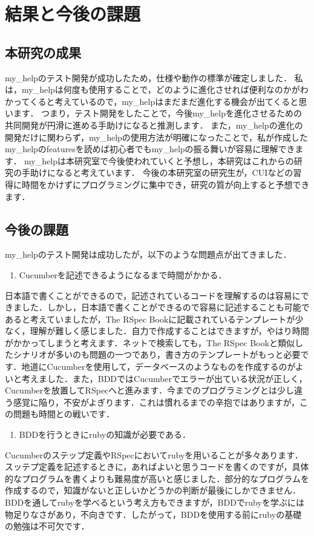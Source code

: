 \section{結果と今後の課題}
\subsection{本研究の成果}
my\_helpのテスト開発が成功したため，仕様や動作の標準が確定しました．
私は，my\_helpは何度も使用することで，どのように進化させれば便利なのかがわかってくると考えているので，my\_helpはまだまだ進化する機会が出てくると思います．
つまり，テスト開発をしたことで，今後my\_helpを進化させるための共同開発が円滑に進める手助けになると推測します．
また，my\_helpの進化の開発だけに関わらず，my\_helpの使用方法が明確になったことで，私が作成したmy\_helpのfeaturesを読めば初心者でもmy\_helpの振る舞いが容易に理解できます．
my\_helpは本研究室で今後使われていくと予想し，本研究はこれからの研究の手助けになると考えています．
今後の本研究室の研究生が，CUIなどの習得に時間をかけずにプログラミングに集中でき，研究の質が向上すると予想できます．

\subsection{今後の課題}
my\_helpのテスト開発は成功したが，以下のような問題点が出てきました．

\begin{enumerate}
\item Cucumberを記述できるようになるまで時間がかかる．
\end{enumerate}
日本語で書くことができるので，記述されているコードを理解するのは容易にできました．しかし，日本語で書くことができるので容易に記述することも可能であると考えていましたが，The RSpec Bookに記載されているテンプレートが少なく，理解が難しく感じました．自力で作成することはできますが，やはり時間がかかってしまうと考えます．ネットで検索しても，The RSpec Bookと類似したシナリオが多いのも問題の一つであり，書き方のテンプレートがもっと必要です．地道にCucumberを使用して，データベースのようなものを作成するのがよいと考えました．また，BDDではCucumberでエラーが出ている状況が正しく，Cucumberを放置してRSpecへと進みます．今までのプログラミングとは少し違う感覚に陥り，不安がよぎります．これは慣れるまでの辛抱ではありますが，この問題も時間との戦いです．

\begin{enumerate}
\item BDDを行うときにrubyの知識が必要である．
\end{enumerate}
Cucumberのステップ定義やRSpecにおいてrubyを用いることが多々あります．スッテプ定義を記述するときに，あればよいと思うコードを書くのですが，具体的なプログラムを書くよりも難易度が高いと感じました．部分的なプログラムを作成するので，知識がないと正しいかどうかの判断が最後にしかできません．BDDを通してrubyを学べるという考え方もできますが，BDDでrubyを学ぶには物足りなさがあり，不向きです．したがって，BDDを使用する前にrubyの基礎の勉強は不可欠です．

